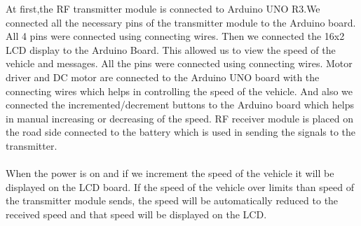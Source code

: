 \documentclass[a4paper,12pt, English]{article}
\newcommand\tab[1][1cm]{\hspace*{#1}}
\begin{document}
\begin{normalsize}
 \tab At first,the RF transmitter module is connected to Arduino UNO R3.We connected all the necessary pins of the transmitter module to the
Arduino board. All 4 pins were connected using connecting wires.
Then we connected the 16x2 LCD display to the Arduino Board.
This allowed us to view the speed of the vehicle and messages. All the pins
were connected using connecting wires.
Motor driver and DC motor are connected to the Arduino UNO board with the connecting wires which helps in controlling the speed of the vehicle.
And also we connected the incremented/decrement buttons to the Arduino board which helps in manual increasing or decreasing of the speed.
RF receiver module is placed on the road side connected to the battery which is used in sending the signals to the transmitter.
\\
\\
When the power is on and if we increment the speed of the vehicle it will be displayed on the LCD board.
If the speed of the vehicle over limits than speed of the transmitter module sends, the speed will be automatically reduced to the received speed and that speed will be displayed on the LCD.
\\
\\


\end{normalsize}
\end{document}
